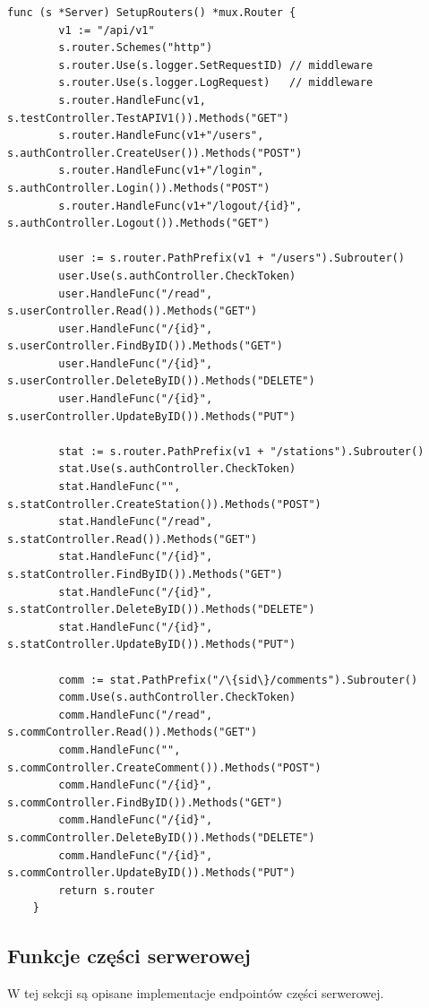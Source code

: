 \begin{lstlisting}[label=list:routers,caption=Implementacja punktów końcowych,basicstyle=\tiny\ttfamily]
    func (s *Server) SetupRouters() *mux.Router {
        v1 := "/api/v1"
        s.router.Schemes("http")
        s.router.Use(s.logger.SetRequestID) // middleware
        s.router.Use(s.logger.LogRequest)   // middleware
        s.router.HandleFunc(v1, s.testController.TestAPIV1()).Methods("GET")
        s.router.HandleFunc(v1+"/users", s.authController.CreateUser()).Methods("POST")
        s.router.HandleFunc(v1+"/login", s.authController.Login()).Methods("POST")
        s.router.HandleFunc(v1+"/logout/{id}", s.authController.Logout()).Methods("GET")

        user := s.router.PathPrefix(v1 + "/users").Subrouter()
        user.Use(s.authController.CheckToken)
        user.HandleFunc("/read", s.userController.Read()).Methods("GET")
        user.HandleFunc("/{id}", s.userController.FindByID()).Methods("GET")
        user.HandleFunc("/{id}", s.userController.DeleteByID()).Methods("DELETE")
        user.HandleFunc("/{id}", s.userController.UpdateByID()).Methods("PUT")

        stat := s.router.PathPrefix(v1 + "/stations").Subrouter()
        stat.Use(s.authController.CheckToken)
        stat.HandleFunc("", s.statController.CreateStation()).Methods("POST")
        stat.HandleFunc("/read", s.statController.Read()).Methods("GET")
        stat.HandleFunc("/{id}", s.statController.FindByID()).Methods("GET")
        stat.HandleFunc("/{id}", s.statController.DeleteByID()).Methods("DELETE")
        stat.HandleFunc("/{id}", s.statController.UpdateByID()).Methods("PUT")

        comm := stat.PathPrefix("/\{sid\}/comments").Subrouter()
        comm.Use(s.authController.CheckToken)
        comm.HandleFunc("/read", s.commController.Read()).Methods("GET")
        comm.HandleFunc("", s.commController.CreateComment()).Methods("POST")
        comm.HandleFunc("/{id}", s.commController.FindByID()).Methods("GET")
        comm.HandleFunc("/{id}", s.commController.DeleteByID()).Methods("DELETE")
        comm.HandleFunc("/{id}", s.commController.UpdateByID()).Methods("PUT")
        return s.router
    }
\end{lstlisting}

% 
\subsection{Funkcje części serwerowej}
W tej sekcji są opisane implementacje endpointów części serwerowej.
% 
